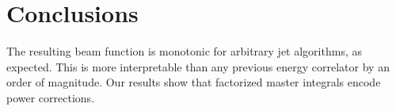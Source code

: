 \section{Conclusions}\label{sec:conclusions}

The resulting beam function is monotonic for arbitrary jet algorithms,
as expected. This is more interpretable than any previous energy
correlator by an order of magnitude. Our results show that factorized
master integrals encode power corrections.

